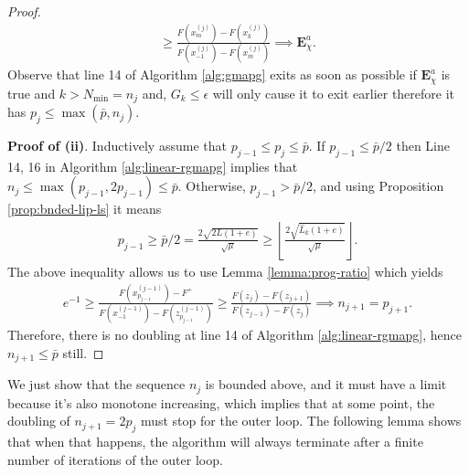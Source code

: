 \documentclass[12pt]{report}
\begin{document}
\begin{proof}
\begin{align*}
{                } 
                \ge 
                \frac{
                    F\left(x_{m}^{(j)}\right)
                    - F\left(x_k^{(j)}\right)
                }{
                    F\left(x_{-1}^{(j)}\right) 
                    - F\left(x_{m}^{(j)}\right)
                } 
                \implies \mathbf E_{\chi}^a. 
            \end{align*}
            Observe that line 14 of Algorithm \ref{alg:gmapg} exits as soon as possible if $\mathbf E_\chi^a$ is true and $k > N_{\min} = n_j$ and, $G_k \le \epsilon$ will only cause it to exit earlier therefore it has $p_j \le \max(\bar p, n_j)$. 
            \par
            \textbf{Proof of (ii)}. 
            Inductively assume that $p_{j - 1} \le p_j \le \bar p$. 
            If $p_{j - 1} \le \bar p /2$ then Line 14, 16 in Algorithm \ref{alg:linear-rgmapg} implies that $n_{j} \le \max(p_{j - 1}, 2p_{j - 1}) \le \bar p$. 
            Otherwise, $p_{j - 1} > \bar p/2$, and using Proposition \ref{prop:bnded-lip-ls} it means 
            \begin{align*}
                p_{j - 1} \ge \bar p /2 = \frac{2\sqrt{2L(1 + e)}}{\sqrt{\mu}} 
                \ge 
                \left \lfloor \frac{2\sqrt{\widehat L_k(1 + e)}}{\sqrt{\mu}} \right\rfloor. 
            \end{align*}
            The above inequality allows us to use Lemma \ref{lemma:prog-ratio} which yields 
            \begin{align*}
                e^{-1} \ge 
                \frac{
                    F\left(x_{p_{j - 1}}^{(j - 1)}\right) - F^+
                }
                {
                    F\left(x_{-1}^{(j - 1)}\right) - F\left(z_{p_{j - 1}}^{(j - 1)}\right)
                }
                \ge 
                \frac{F(z_j) - F(z_{j + 1})}
                {F(z_{j - 1}) - F(z_{j})} \implies n_{j + 1} = p_{j + 1}.
            \end{align*}
            Therefore, there is no doubling at line 14 of Algorithm \ref{alg:linear-rgmapg}, hence $n_{j + 1} \le \bar p$ still. 
        \end{proof}
        \par
        We just show that the sequence $n_j$ is bounded above, and it must have a limit because it's also monotone increasing, which implies that at some point, the doubling of $n_{j + 1} = 2p_j$ must stop for the outer loop. 
        The following lemma shows that when that happens, the algorithm will always terminate after a finite number of iterations of the outer loop. 
\end{document}
